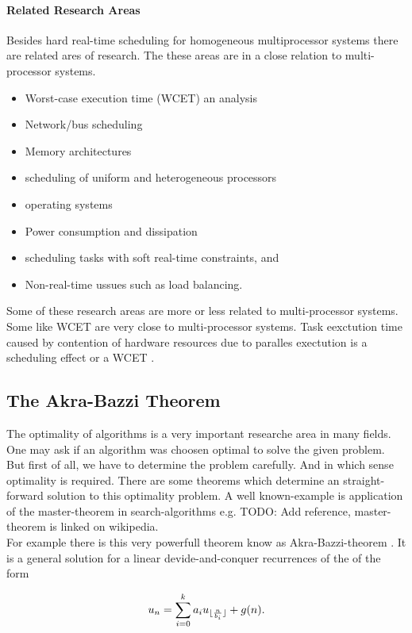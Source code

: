 \paragraph{Related Research Areas}
Besides hard real-time scheduling for homogeneous multiprocessor systems there are related ares of research. The these areas are in a  close relation to multi-processor systems.
\begin{itemize}
\item Worst-case execution time (WCET) an analysis
\item Network/bus scheduling
\item Memory architectures
\item scheduling of uniform and heterogeneous processors
\item operating systems
\item Power consumption and dissipation
\item scheduling tasks with soft real-time constraints, and
\item Non-real-time ussues such as load balancing.
\end{itemize}
Some of these research areas are more or less related to multi-processor systems. Some like WCET are very close to multi-processor systems.
Task eexctution time caused by contention of hardware resources due to paralles exectution is a scheduling effect or a WCET \cite[Sec. 10.2]{DB2011}.
 
\subsection{The Akra-Bazzi Theorem}
\label{subsection:The Akra-Bazzi Theorem}
The optimality of algorithms is a very important researche area in many fields.
One may ask if an algorithm was choosen optimal to solve the given problem.
But first of all, we have to determine the problem carefully. And in which sense optimality is required. There are some theorems which determine an straight-forward solution to this optimality problem. A well known-example is application of the master-theorem in search-algorithms e.g. \cite {}TODO: Add reference, master-theorem is linked on wikipedia.\\
For example there is this very powerfull theorem know as Akra-Bazzi-theorem \cite{AB98}.
It is a general solution for a linear devide-and-conquer recurrences of the of the form

 \begin{equation}
 \label{eq:linearDevideAndConquerRecurrence}
 u_n = \sum_{i=0}^k a_i u _{\lfloor\frac{n}{b_i}\rfloor} + g(n).
 \end{equation}
 
